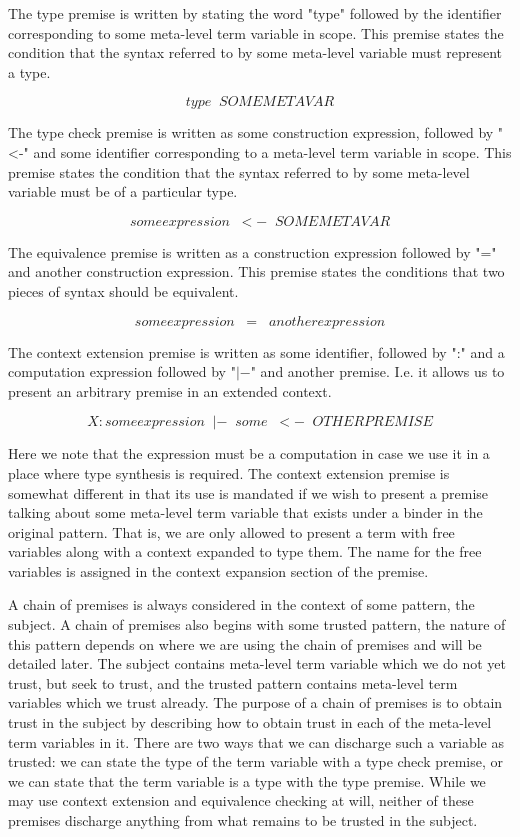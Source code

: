 The type premise is written by stating the word "type" followed by
the identifier corresponding to some meta-level term variable in
scope. This premise states the condition that the syntax referred to
by some meta-level variable must represent a type.

$$
type \;\; SOMEMETAVAR
$$

The type check premise is written as some construction expression,
followed by "\textless -" and some identifier corresponding to a
meta-level term variable in scope. This premise states the condition that
the syntax referred to by some meta-level variable must be of a
particular type.

$$
someexpression \;\;<-\;\; SOMEMETAVAR
$$

The equivalence premise is written as a construction expression
followed by "=" and another construction expression. This premise
states the conditions that two pieces of syntax should be equivalent.

$$
someexpression \;\;=\;\; anotherexpression
$$

The context extension premise is written as some identifier,
followed by ":" and a computation expression followed by "$|-$" and
another premise. I.e. it allows us to present an arbitrary premise in
an extended context.

$$
X : someexpression \;\;|-\;\; some \;\;<-\;\; OTHERPREMISE
$$

Here we note that the expression must be a computation in case we use
it in a place where type synthesis is required. The context
extension premise is somewhat different in that its use is mandated if
we wish to present a premise talking about some meta-level term
variable that exists under a binder in the original pattern. That is,
we are only allowed to present a term with free variables along with a
context expanded to type them. The name for the free variables is
assigned in the context expansion section of the premise.

A chain of premises is always considered in the context of some
pattern, the subject. A chain of premises also begins with some
trusted pattern, the nature of this pattern depends on where we are
using the chain of premises and will be detailed later. The subject
contains meta-level term variable which we do not yet trust, but seek
to trust, and the trusted pattern contains meta-level term variables
which we trust already. The purpose of a chain of premises is to obtain
trust in the subject by describing how to obtain trust in each of the
meta-level term variables in it. There are two ways that we can
discharge such a variable as trusted: we can state the type of the
term variable with a type check premise, or we can state that the term
variable is a type with the type premise. While we may use context
extension and equivalence checking at will, neither of these premises
discharge anything from what remains to be trusted in the subject.

